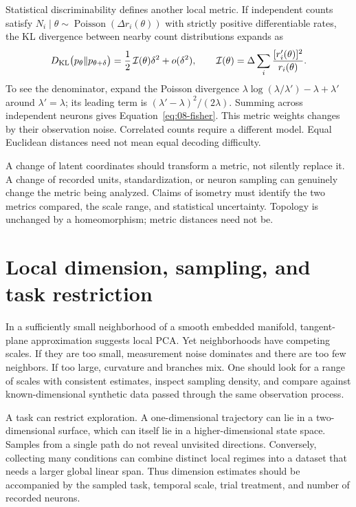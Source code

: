 Statistical discriminability defines another local metric. If independent counts satisfy $N_i\mid\theta\sim\operatorname{Poisson}(\Delta r_i(\theta))$ with strictly positive differentiable rates, the KL divergence between nearby count distributions expands as
\begin{equation}
 D_{\rm KL}\big(p_\theta\Vert p_{\theta+\delta}\big)
 =\frac12\,\mathcal I(\theta)\delta^2+o(\delta^2),\qquad
 \mathcal I(\theta)=\Delta\sum_i\frac{[r_i'(\theta)]^2}{r_i(\theta)}.
 \label{eq:08-fisher}
\end{equation}
To see the denominator, expand the Poisson divergence
$\lambda\log(\lambda/\lambda')-\lambda+\lambda'$ around $\lambda'=\lambda$; its leading term is $(\lambda'-\lambda)^2/(2\lambda)$. Summing across independent neurons gives Equation~\eqref{eq:08-fisher}. This metric weights changes by their observation noise. Correlated counts require a different model. Equal Euclidean distances need not mean equal decoding difficulty.

A change of latent coordinates should transform a metric, not silently replace it. A change of recorded units, standardization, or neuron sampling can genuinely change the metric being analyzed. Claims of isometry must identify the two metrics compared, the scale range, and statistical uncertainty. Topology is unchanged by a homeomorphism; metric distances need not be.

\section{Local dimension, sampling, and task restriction}
In a sufficiently small neighborhood of a smooth embedded manifold, tangent-plane approximation suggests local PCA. Yet neighborhoods have competing scales. If they are too small, measurement noise dominates and there are too few neighbors. If too large, curvature and branches mix. One should look for a range of scales with consistent estimates, inspect sampling density, and compare against known-dimensional synthetic data passed through the same observation process.

A task can restrict exploration. A one-dimensional trajectory can lie in a two-dimensional surface, which can itself lie in a higher-dimensional state space. Samples from a single path do not reveal unvisited directions. Conversely, collecting many conditions can combine distinct local regimes into a dataset that needs a larger global linear span. Thus dimension estimates should be accompanied by the sampled task, temporal scale, trial treatment, and number of recorded neurons.

